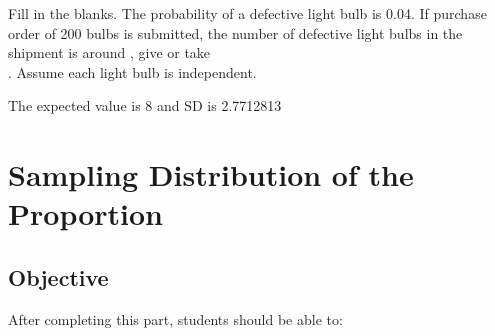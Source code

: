 \documentclass[11pt, chapterprefix=true]{scrbook}\usepackage[]{graphicx}\usepackage[]{color}
\begin{document}
\begin{exercises}
		\begin{exercise}  %

Fill in the blanks. The probability of a defective light bulb is 0.04. If purchase order of 200 bulbs is submitted, the number of defective light bulbs in the shipment is around \underline{\phantom{xxxxxxxx}}, give or take \\ \underline{\phantom{xxxxxxxx}}. Assume each light bulb is independent.
	  \end{exercise}
	  \begin{solution}  %


The expected value is 8 and SD is 2.7712813
	\end{solution}

%
\end{exercises}
\onecolumn




\chapter{Sampling Distribution of the Proportion}
\label{chap:ch8}

\section{Objective}

After completing this part, students should be able to:

\end{document}
